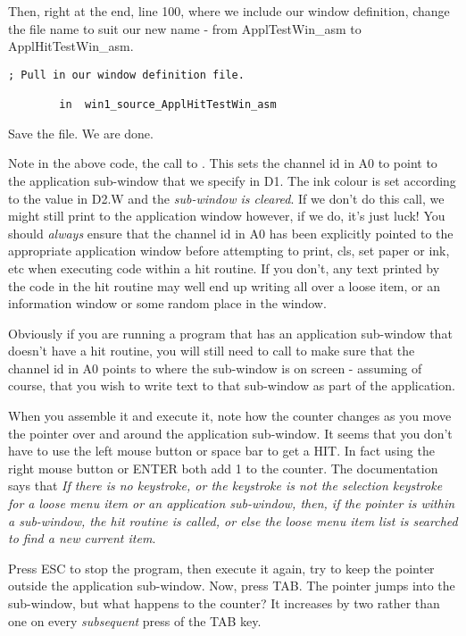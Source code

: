 Then, right at the end, line 100, where we include our window definition, change the
        file name to suit our new name -{} from ApplTestWin\_asm to
 ApplHitTestWin\_asm.

\begin{lstlisting}[firstnumber=100,caption={ApplTest\_asm - Including the Window Definition}]
; Pull in our window definition file.

        in  win1_source_ApplHitTestWin_asm
\end{lstlisting}

Save the file. We are done.

Note in the above code, the call to . This sets the channel id in A0
        to point to the application sub-{}window that we specify in D1. The ink colour is
        set according to the value in D2.W and the \emph{sub-{}window is
        cleared}. If we don't do this call, we might still print to the
        application window however, if we do, it's just luck! You should
 \emph{always} ensure that the channel id in A0 has been explicitly
        pointed to the appropriate application window before attempting to print, cls, set
        paper or ink, etc when executing code within a hit routine. If you don't, any text
        printed by the code in the hit routine may well end up writing all over a loose
        item, or an information window or some random place in the window.

Obviously if you are running a program that has an application sub-{}window
        that doesn't have a hit routine, you will still need to call  to make sure
        that the channel id in A0 points to where the sub-{}window is on screen -{} assuming
        of course, that you wish to write text to that sub-{}window as part of the
        application.

When you assemble it and execute it, note how the counter changes as you
        move the pointer over and around the application sub-{}window. It seems that you
        don't have to use the left mouse button or space bar to get a HIT. In fact using
        the right mouse button or ENTER both add 1 to the counter. The documentation says
        that \emph{If there is no keystroke, or the keystroke is not the selection
        keystroke for a loose menu item or an application sub-{}window, then, if the pointer
        is within a sub-{}window, the hit routine is called, or else the loose menu item
        list is searched to find a new current item}.

Press ESC to stop the program, then execute it again, try to keep the
        pointer outside the application sub-{}window. Now, press TAB. The pointer jumps into
        the sub-{}window, but what happens to the counter? It increases by two rather than
        one on every \emph{subsequent} press of the TAB key.

